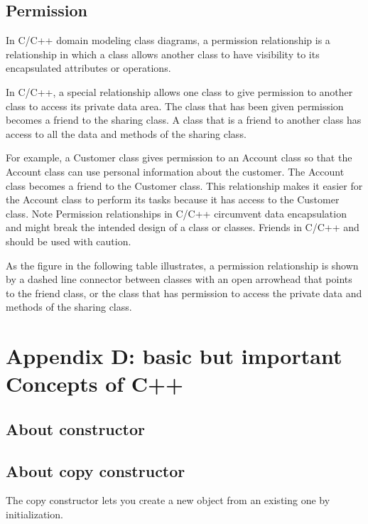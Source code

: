 \documentclass{book}
\begin{document}
\subsection{Permission}
In C/C++ domain modeling class diagrams, a permission relationship is a relationship in which a class allows another class to have visibility to its encapsulated attributes or operations.

In C/C++, a special relationship allows one class to give permission to another class to access its private data area.
The class that has been given permission becomes a friend to the sharing class. A class that is a friend to another class has access to all the data and methods of the sharing class.

For example, a Customer class gives permission to an Account class so that the Account class can use personal information about the customer.
The Account class becomes a friend to the Customer class. This relationship makes it easier for the Account class to perform its tasks because it has access to the Customer class.
Note
Permission relationships in C/C++ circumvent data encapsulation and might break the intended design of a class or classes. Friends in C/C++ and should be used with caution.

As the figure in the following table illustrates, a permission relationship is shown by a dashed line connector between classes with an open arrowhead that points to the friend class,
or the class that has permission to access the private data and methods of the sharing class. 
\begin{figure}[H]
\begin{floatrow}
\end{floatrow}
\end{figure}


\section{Appendix D: basic but important Concepts of C++ }
\subsection{About constructor}
\subsection{About copy constructor}
The copy constructor lets you create a new object from an existing one by initialization. 
\end{document}
